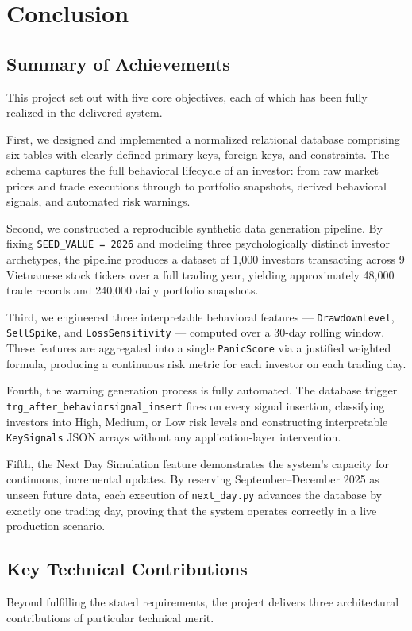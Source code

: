 \section{Conclusion}

\subsection{Summary of Achievements}
This project set out with five core objectives, each of which has been fully realized in the delivered system.

First, we designed and implemented a normalized relational database comprising six tables with clearly defined primary keys, foreign keys, and constraints. The schema captures the full behavioral lifecycle of an investor: from raw market prices and trade executions through to portfolio snapshots, derived behavioral signals, and automated risk warnings.

Second, we constructed a reproducible synthetic data generation pipeline. By fixing \texttt{SEED\_VALUE = 2026} and modeling three psychologically distinct investor archetypes, the pipeline produces a dataset of 1,000 investors transacting across 9 Vietnamese stock tickers over a full trading year, yielding approximately 48,000 trade records and 240,000 daily portfolio snapshots.

Third, we engineered three interpretable behavioral features — \texttt{DrawdownLevel}, \texttt{SellSpike}, and \texttt{LossSensitivity} — computed over a 30-day rolling window. These features are aggregated into a single \texttt{PanicScore} via a justified weighted formula, producing a continuous risk metric for each investor on each trading day.

Fourth, the warning generation process is fully automated. The database trigger \texttt{trg\_after\_behaviorsignal\_insert} fires on every signal insertion, classifying investors into High, Medium, or Low risk levels and constructing interpretable \texttt{KeySignals} JSON arrays without any application-layer intervention.

Fifth, the Next Day Simulation feature demonstrates the system's capacity for continuous, incremental updates. By reserving September–December 2025 as unseen future data, each execution of \texttt{next\_day.py} advances the database by exactly one trading day, proving that the system operates correctly in a live production scenario.

\subsection{Key Technical Contributions}
Beyond fulfilling the stated requirements, the project delivers three architectural contributions of particular technical merit.

